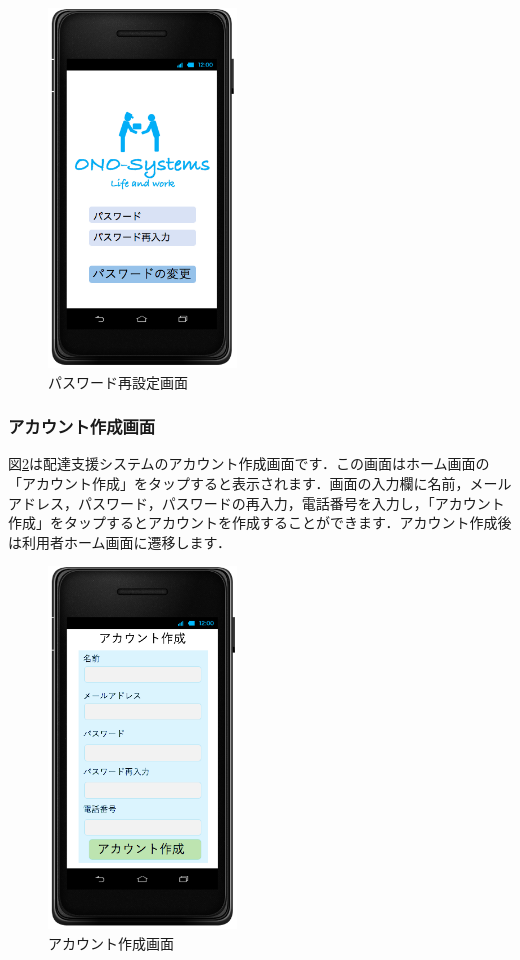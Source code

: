 \documentclass[a4j,titlepage]{jarticle}
\begin{document}
\begin{figure}[H]
 \begin{center}
  \includegraphics[width=50mm]{ps_change.png}
	\caption{パスワード再設定画面}
	\label{fig:ps_change}
 \end{center}

\end{figure}
\newpage
\subsubsection{アカウント作成画面}
図\ref{fig:account_create}は配達支援システムのアカウント作成画面です．この画面はホーム画面の「アカウント作成」をタップすると表示されます．画面の入力欄に名前，メールアドレス，パスワード，パスワードの再入力，電話番号を入力し，「アカウント作成」をタップするとアカウントを作成することができます．アカウント作成後は利用者ホーム画面に遷移します．

\begin{figure}[H]
 \begin{center}
  \includegraphics[width=50mm]{account_create.png}
	\caption{アカウント作成画面}
	\label{fig:account_create}
 \end{center}

\end{figure}
\end{document}

